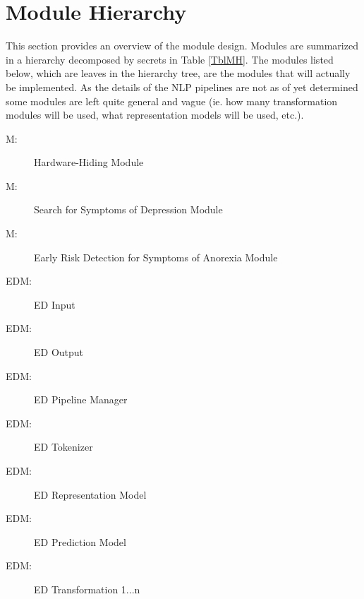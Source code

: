 \documentclass[12pt, titlepage]{article}
\newcounter{mnum}
\newcommand{\mthemnum}{M\themnum}
\newcounter{edmnum}
\newcommand{\edmthemnum}{EDM\theedmnum}
\begin{document}
\section{Module Hierarchy} \label{SecMH}

This section provides an overview of the module design. Modules are summarized
in a hierarchy decomposed by secrets in Table \ref{TblMH}. The modules listed
below, which are leaves in the hierarchy tree, are the modules that will
actually be implemented. As the details of the NLP pipelines are not as of yet determined some modules are left quite general and vague (ie. how many transformation modules will be used, what representation models will be used, etc.).

\begin{description}
\item [ \mthemnum \label{mHH}:] Hardware-Hiding Module
\item [ \mthemnum \label{m2}:] Search for Symptoms of Depression Module
\item [ \mthemnum \label{m3}:] Early Risk Detection for Symptoms of Anorexia Module
\item [ \edmthemnum \label{edmI}:] ED Input
\item [ \edmthemnum \label{edmO}:] ED Output
\item [ \edmthemnum \label{edmPipeline}:] ED Pipeline Manager
\item [ \edmthemnum \label{edmToken}:] ED Tokenizer
\item [ \edmthemnum \label{edmRM}:] ED Representation Model
\item [ \edmthemnum \label{edmPM}:] ED Prediction Model
\item [ \edmthemnum \label{edmTrans}:] ED Transformation 1...n
\end{description}
\end{document}
